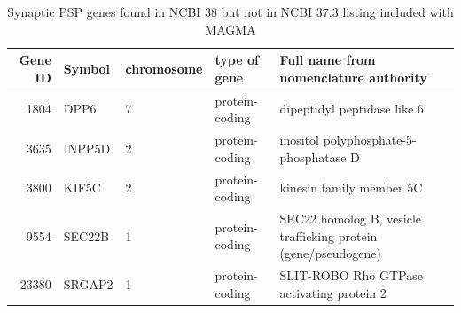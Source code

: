 \begin{table}[ht]
\centering
\begin{adjustbox}{max width=\textwidth}
\begin{tabular}{rllll}
  \hline
 Gene ID & Symbol & chromosome & type of gene & Full name from nomenclature authority \\ 
  \hline
1804 & DPP6 & 7 & protein-coding & dipeptidyl peptidase like 6 \\ 
  3635 & INPP5D & 2 & protein-coding & inositol polyphosphate-5-phosphatase D \\ 
  3800 & KIF5C & 2 & protein-coding & kinesin family member 5C \\ 
  9554 & SEC22B & 1 & protein-coding & SEC22 homolog B, vesicle trafficking protein (gene/pseudogene) \\ 
  23380 & SRGAP2 & 1 & protein-coding & SLIT-ROBO Rho GTPase activating protein 2 \\ 
   \hline
\end{tabular}
\end{adjustbox}
\caption{Synaptic PSP genes  found in NCBI 38 but not in NCBI 37.3 listing included with MAGMA}
\label{tab:Synaptic PSP genes  found in NCBI 38 but not in 37 listing included with MAGMA}
\end{table}
   


